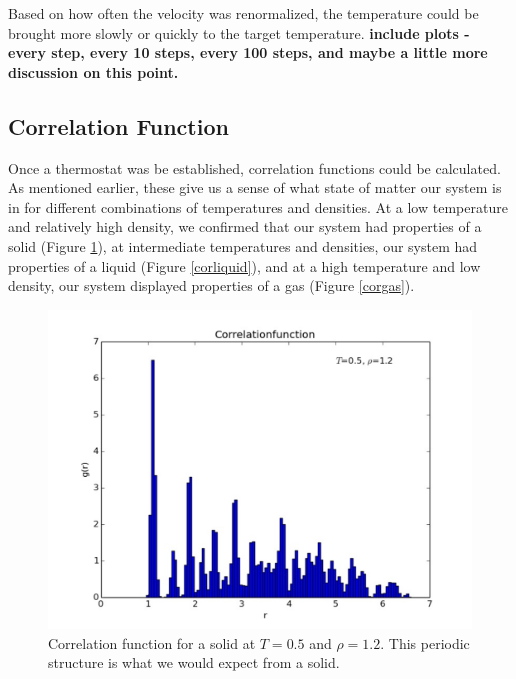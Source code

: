\documentclass{article}
\begin{document}
\begin{multicols}{2}
Based on how often the velocity was renormalized, the temperature could be brought more slowly or quickly to the target temperature.  \textbf{include plots - every step, every 10 steps, every 100 steps, and maybe a little more discussion on this point.}

\subsection{Correlation Function}

Once a thermostat was be established, correlation functions could be calculated.  As mentioned earlier, these give us a sense of what state of matter our system is in for different combinations of temperatures and densities.  At a low temperature and relatively high density, we confirmed that our system had properties of a solid (Figure \ref{corsolid}), at intermediate temperatures and densities, our system had properties of a liquid (Figure \ref{corliquid}), and at a high temperature and low density, our system displayed properties of a gas (Figure \ref{corgas}).  

\begin{figure}[H]
\begin{center}
\includegraphics[width=\linewidth]{plots/correlationfunctionT05rho12x.pdf}
\caption{Correlation function for a solid at $T=0.5$ and $\rho=1.2$.  This periodic structure is what we would expect from a solid.}
\label{corsolid}
\end{center}
\end{figure}


\end{multicols}
\end{document}
